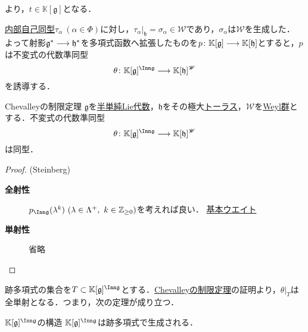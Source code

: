 \documentclass[rep_main]{subfiles}
\begin{document}
より，$t \in \mathbb{K}[\mathfrak{g}]$となる．


\hyperref[def:inner-LieAlg]{内部自己同型}$\tau_\alpha\ (\alpha \in \Phi)$に対し，$\tau_\alpha|_\mathfrak{h} = \sigma_\alpha \in \mathscr{W}$であり，$\sigma_\alpha$は$\mathscr{W}$を生成した．\\
よって射影$\mathfrak{g}^* \longrightarrow \mathfrak{h}^*$を多項式函数へ拡張したものを$p\colon \mathbb{K}[\mathfrak{g}] \longrightarrow \mathbb{K}[\mathfrak{h}]$とすると，$p$は不変式の代数準同型
\begin{equation}
	\theta \colon \mathbb{K}[\mathfrak{g}]^{\Inn\mathfrak{g}} \lto \mathbb{K}[\mathfrak{h}]^\mathscr{W}
\end{equation}
を誘導する．
\begin{mytheo}[label=thm:Chevalley-restriction]{Chevalleyの制限定理}
	$\mathfrak{g}$を\hyperref[def:semisimple-LieAlg]{半単純Lie代数}，$\mathfrak{h}$をその極大\hyperref[def:toral-subLieAlg]{トーラス}，$\mathscr{W}$を\hyperref[def:Weylgroup]{Weyl群}とする．不変式の代数準同型
	\begin{equation}
		\theta\colon \mathbb{K}[\mathfrak{g}]^{\Inn\mathfrak{g}} \lto \mathbb{K}[\mathfrak{h}]^\mathscr{W}
	\end{equation}
	は同型．
\end{mytheo}
\begin{proof}(Steinberg)
	\begin{description}
		\item[\textbf{全射性}] $p_{\Inn \mathfrak{g}}(\lambda^k)\ (\lambda \in \Lambda^+,\ k \in \mathbb{Z}_{\geq 0})$を考えれば良い．
		\hyperref[def:fundamental-weight]{基本ウエイト}
		\item[\textbf{単射性}] 省略
	\end{description}
\end{proof}
跡多項式の集合を$T \subset \mathbb{K}[\mathfrak{g}]^{\Inn\mathfrak{g}}$とする．\hyperref[thm:Chevalley-restriction]{Chevalleyの制限定理}の証明より，$\theta|_T$は全単射となる．つまり，次の定理が成り立つ．
\begin{mytheo}[label=thm:Inn-G-invariant-structure]{$\mathbb{K}[\mathfrak{g}]^{\Inn\mathfrak{g}}$の構造}
	$\mathbb{K}[\mathfrak{g}]^{\Inn\mathfrak{g}}$は跡多項式で生成される．
\end{mytheo}
\end{document}
